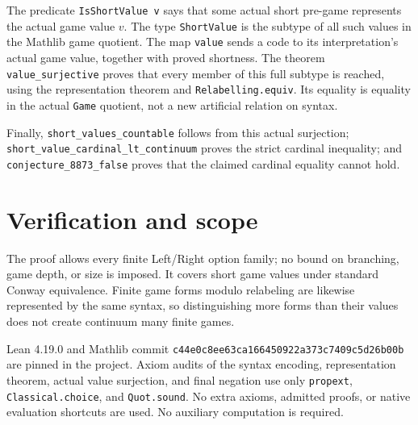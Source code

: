 \documentclass[10pt,a4paper]{article}
\begin{document}
The predicate \texttt{IsShortValue v} says that some actual short
pre-game represents the actual game value $v$.
The type \texttt{ShortValue} is the subtype of all such values in the
Mathlib game quotient. The map \texttt{value} sends a code to its
interpretation's actual game value, together with proved shortness.
The theorem \texttt{value\_surjective} proves that every member of this
full subtype is reached, using the representation theorem and
\texttt{Relabelling.equiv}. Its equality is equality in the actual
\texttt{Game} quotient, not a new artificial relation on syntax.

Finally, \texttt{short\_values\_countable} follows from this actual
surjection; \texttt{short\_value\_cardinal\_lt\_continuum} proves the
strict cardinal inequality; and \texttt{conjecture\_8873\_false}
proves that the claimed cardinal equality cannot hold.

\section*{Verification and scope}
The proof allows every finite Left/Right option family; no bound on
branching, game depth, or size is imposed. It covers short game values
under standard Conway equivalence. Finite game forms modulo relabeling
are likewise represented by the same syntax, so distinguishing more
forms than their values does not create continuum many finite games.

Lean 4.19.0 and Mathlib commit
\texttt{c44e0c8ee63ca166450922a373c7409c5d26b00b}
are pinned in the project. Axiom audits of the syntax encoding,
representation theorem, actual value surjection, and final negation
use only \texttt{propext}, \texttt{Classical.choice}, and
\texttt{Quot.sound}. No extra axioms, admitted proofs, or native
evaluation shortcuts are used. No auxiliary computation is required.
\end{document}
